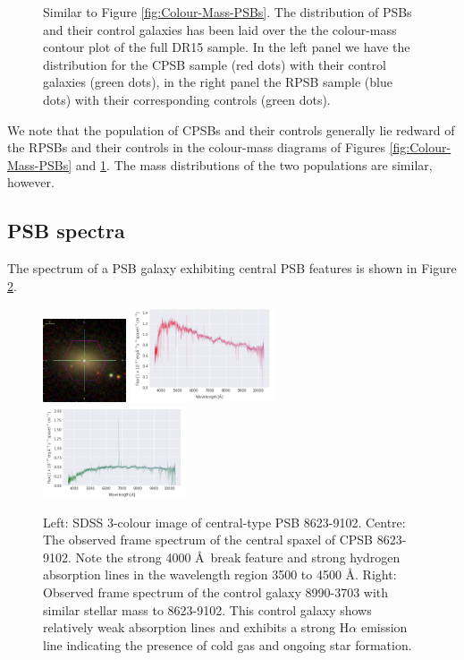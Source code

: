 \begin{figure}
    \caption{Similar to Figure \ref{fig:Colour-Mass-PSBs}. The distribution of PSBs and their control galaxies has been laid over the the colour-mass contour plot of the full DR15 sample. In the left panel we have the distribution for the CPSB sample (red dots) with their control galaxies (green dots), in the right panel the RPSB sample (blue dots) with their corresponding controls (green dots).}
    \label{fig:Colour-Mass-PSBs-controls}
\end{figure}

We note that the population of CPSBs and their controls generally lie redward of the RPSBs and their controls in the colour-mass diagrams of Figures \ref{fig:Colour-Mass-PSBs} and \ref{fig:Colour-Mass-PSBs-controls}. The mass distributions of the two populations are similar, however. 

\subsection{PSB spectra}
The spectrum of a PSB galaxy exhibiting central PSB features is shown in Figure \ref{fig:CPSB-8623-9102-spec}.
\begin{figure}
    \centering
    \includegraphics[width=0.22\textwidth]{images/Cutouts/CPSB-8623-9102-IM.png}
    \hfill
    \includegraphics[width=0.38\textwidth]{images/Spectra/CPSB-8623-9102.png}
    \hfill
    \includegraphics[width=0.38\textwidth]{images/Spectra/CPSB-CTRL-8990-3703-spec.png}
    \caption{Left: SDSS 3-colour image of central-type PSB 8623-9102. 
    Centre: The observed frame spectrum of the central spaxel of CPSB  8623-9102. Note the strong 4000 \AA\ break feature and strong hydrogen absorption lines in the wavelength region 3500 to 4500 \AA.
    Right: Observed frame spectrum of the control galaxy 8990-3703 with similar stellar mass to 8623-9102. This control galaxy shows relatively weak absorption lines and exhibits a strong H$\alpha$ emission line indicating the presence of cold gas and ongoing star formation.}
    \label{fig:CPSB-8623-9102-spec}
\end{figure}


